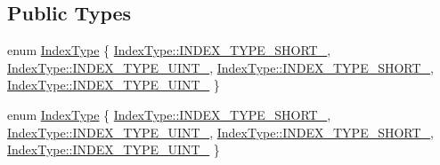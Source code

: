 \subsection*{Public Types}
\begin{DoxyCompactItemize}
\item 
enum \hyperlink{classIndexBuffer_ae2117eacd3734db21ce838397fe96c63}{Index\+Type} \{ \hyperlink{classIndexBuffer_ae2117eacd3734db21ce838397fe96c63a031702ff5151fd42cd353ea7bbfbe1c9}{Index\+Type\+::\+I\+N\+D\+E\+X\+\_\+\+T\+Y\+P\+E\+\_\+\+S\+H\+O\+R\+T\+\_}, 
\hyperlink{classIndexBuffer_ae2117eacd3734db21ce838397fe96c63aaa75819ff26028922054c6af233b6d3d}{Index\+Type\+::\+I\+N\+D\+E\+X\+\_\+\+T\+Y\+P\+E\+\_\+\+U\+I\+N\+T\+\_}, 
\hyperlink{classIndexBuffer_ae2117eacd3734db21ce838397fe96c63a031702ff5151fd42cd353ea7bbfbe1c9}{Index\+Type\+::\+I\+N\+D\+E\+X\+\_\+\+T\+Y\+P\+E\+\_\+\+S\+H\+O\+R\+T\+\_}, 
\hyperlink{classIndexBuffer_ae2117eacd3734db21ce838397fe96c63aaa75819ff26028922054c6af233b6d3d}{Index\+Type\+::\+I\+N\+D\+E\+X\+\_\+\+T\+Y\+P\+E\+\_\+\+U\+I\+N\+T\+\_}
 \}
\item 
enum \hyperlink{classIndexBuffer_ae2117eacd3734db21ce838397fe96c63}{Index\+Type} \{ \hyperlink{classIndexBuffer_ae2117eacd3734db21ce838397fe96c63a031702ff5151fd42cd353ea7bbfbe1c9}{Index\+Type\+::\+I\+N\+D\+E\+X\+\_\+\+T\+Y\+P\+E\+\_\+\+S\+H\+O\+R\+T\+\_}, 
\hyperlink{classIndexBuffer_ae2117eacd3734db21ce838397fe96c63aaa75819ff26028922054c6af233b6d3d}{Index\+Type\+::\+I\+N\+D\+E\+X\+\_\+\+T\+Y\+P\+E\+\_\+\+U\+I\+N\+T\+\_}, 
\hyperlink{classIndexBuffer_ae2117eacd3734db21ce838397fe96c63a031702ff5151fd42cd353ea7bbfbe1c9}{Index\+Type\+::\+I\+N\+D\+E\+X\+\_\+\+T\+Y\+P\+E\+\_\+\+S\+H\+O\+R\+T\+\_}, 
\hyperlink{classIndexBuffer_ae2117eacd3734db21ce838397fe96c63aaa75819ff26028922054c6af233b6d3d}{Index\+Type\+::\+I\+N\+D\+E\+X\+\_\+\+T\+Y\+P\+E\+\_\+\+U\+I\+N\+T\+\_}
 \}
\end{DoxyCompactItemize}
